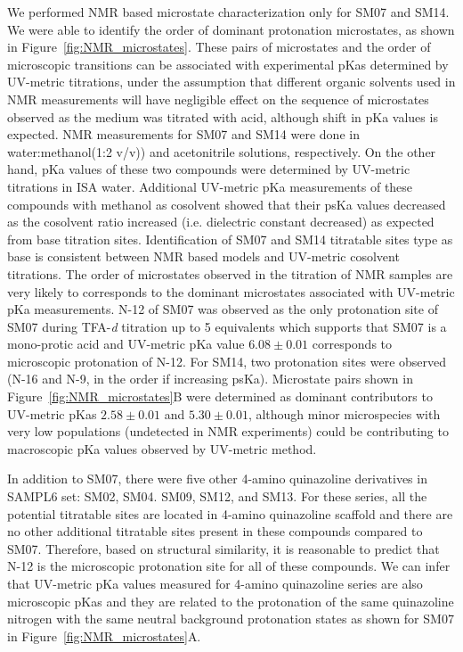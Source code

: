 \documentclass[9pt,lineno]{elife}
\begin{document}
We performed NMR based microstate characterization only for SM07 and SM14. We were able to identify the order of dominant protonation microstates, as shown in Figure~\ref{fig:NMR_microstates}. 
These pairs of microstates and the order of microscopic transitions can be associated with experimental pKas determined by UV-metric titrations, under the assumption that different organic solvents used in NMR measurements will have negligible effect on the sequence of microstates observed as the medium was titrated with acid, although shift in pKa values is expected. NMR measurements for SM07 and SM14 were done in water:methanol(1:2 v/v)) and acetonitrile solutions, respectively. 
On the other hand, pKa values of these two compounds were determined by UV-metric titrations in ISA water. Additional UV-metric pKa measurements of these compounds with methanol as cosolvent showed that their psKa values decreased as the cosolvent ratio increased (i.e. dielectric constant decreased) as expected from base titration sites. 
Identification of SM07 and SM14 titratable sites type as base is consistent between NMR based models and UV-metric cosolvent titrations. 
The order of microstates observed in the titration of NMR samples are very likely to corresponds to the dominant microstates associated with UV-metric pKa measurements. N-12 of SM07 was observed as the only protonation site of SM07 during TFA-\textit{d} titration up to 5 equivalents which supports that SM07 is a mono-protic acid and UV-metric pKa value $6.08 \pm 0.01$ corresponds to microscopic protonation of N-12. For SM14, two protonation sites were observed (N-16 and N-9, in the order if increasing psKa). Microstate pairs shown in Figure~\ref{fig:NMR_microstates}B were determined as dominant contributors to UV-metric pKas $2.58 \pm 0.01 $ and $5.30 \pm 0.01$, although minor microspecies with very low populations (undetected in NMR experiments) could be contributing to macroscopic pKa values observed by UV-metric method. 

In addition to SM07, there were five other 4-amino quinazoline derivatives in SAMPL6 set: SM02, SM04. SM09, SM12, and SM13. For these series, all the potential titratable sites are located in 4-amino quinazoline scaffold and there are no other additional titratable sites present in these compounds compared to SM07. Therefore, based on structural similarity, it is reasonable to predict that N-12 is the microscopic protonation site for all of these compounds. We can infer that UV-metric pKa values measured for 4-amino quinazoline series are also microscopic pKas and they are related to the protonation of the same quinazoline nitrogen with the same neutral background protonation states as shown for SM07 in Figure~\ref{fig:NMR_microstates}A.
\end{document}
